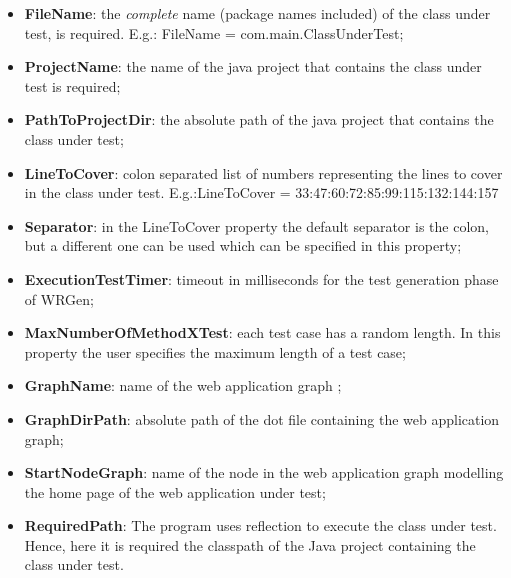 \begin{itemize}
	\item \textbf{FileName}: the \textit{complete} name (package names included) of the class under test, is required.	E.g.: FileName = com.main.ClassUnderTest;
	\item \textbf{ProjectName}: the name of the java project that contains the class under test is required;
	\item \textbf{PathToProjectDir}: the absolute path of the java project that contains the class under test;
	\item \textbf{LineToCover}: colon separated list of numbers representing the lines to cover in the class under test. E.g.:LineToCover = 33:47:60:72:85:99:115:132:144:157
	\item \textbf{Separator}: in the LineToCover property the default separator is the colon, but a different one can be used which can be specified in this property;
	\item \textbf{ExecutionTestTimer}: timeout in milliseconds for the test generation phase of WRGen;
	\item \textbf{MaxNumberOfMethodXTest}: each test case has a random length. In this property the user specifies the maximum length of a test case;
	\item \textbf{GraphName}: name of the web application graph ;
	\item \textbf{GraphDirPath}: absolute path of the dot file containing the web application graph;
	\item \textbf{StartNodeGraph}: name of the node in the web application graph modelling the home page of the web application under test;
	\item \textbf{RequiredPath}: The program uses reflection to execute the class under test. Hence, here it is required the classpath of the Java project containing the class under test.
\end{itemize}